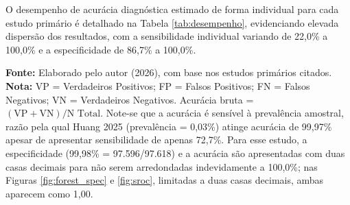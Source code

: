 \documentclass[12pt,a4paper]{article}
\begin{document}
O desempenho de acurácia diagnóstica estimado de forma individual para cada estudo primário é detalhado na Tabela \ref{tab:desempenho}, evidenciando elevada dispersão dos resultados, com a sensibilidade individual variando de 22,0\% a 100,0\% e a especificidade de 86,7\% a 100,0\%.

\begin{table}[H]
\centering
\caption{Desempenho Diagnóstico Individual dos Estudos}
\label{tab:desempenho}
\begin{singlespace}
\end{singlespace}
\vspace{0.2cm}
\begin{singlespace}
\small \noindent \textbf{Fonte:} Elaborado pelo autor (2026), com base nos estudos primários citados. \\
\textbf{Nota:} VP = Verdadeiros Positivos; FP = Falsos Positivos; FN = Falsos Negativos; VN = Verdadeiros Negativos. Acurácia bruta = $(\text{VP}+\text{VN})/\text{N Total}$. Note-se que a acurácia é sensível à prevalência amostral, razão pela qual Huang 2025 (prevalência = 0,03\%) atinge acurácia de 99,97\% apesar de apresentar sensibilidade de apenas 72,7\%. Para esse estudo, a especificidade (99,98\% = 97.596/97.618) e a acurácia são apresentadas com duas casas decimais para não serem arredondadas indevidamente a 100,0\%; nas Figuras \ref{fig:forest_spec} e \ref{fig:sroc}, limitadas a duas casas decimais, ambas aparecem como 1,00.
\end{singlespace}
\end{table}
\end{document}

